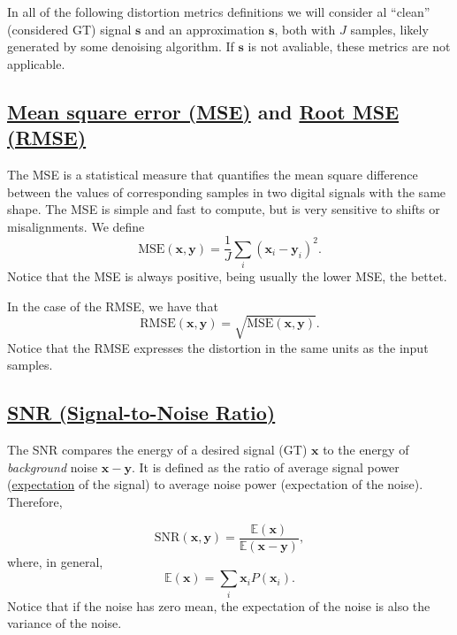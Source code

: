 \documentclass{article}
\begin{document}
In all of the following distortion metrics definitions we will
consider al ``clean'' (considered GT) signal $\mathbf{s}$ and an
approximation $\mathbf{s}$, both with $J$ samples, likely
generated by some denoising algorithm. If $\mathbf{s}$ is not
avaliable, these metrics are not applicable.

\subsection{\href{https://en.wikipedia.org/wiki/Mean_squared_error}{Mean square error (MSE)} and \href{https://en.wikipedia.org/wiki/Root_mean_square_deviation}{Root MSE (RMSE)}}

The MSE is a statistical measure that quantifies the mean square
difference between the values of corresponding samples in two digital
signals with the same shape. The MSE is simple and fast to compute,
but is very sensitive to shifts or misalignments. We define
\begin{equation}
  \text{MSE}(\mathbf{x},\mathbf{y}) = \frac{1}{J}\sum_i(\mathbf{x}_i - \mathbf{y}_i)^2.
  \label{eq:MSE}
\end{equation}
Notice that the MSE is always positive, being usually the lower MSE, the bettet.

In the case of the RMSE, we have that
\begin{equation}
  \text{RMSE}(\mathbf{x},\mathbf{y}) = \sqrt{\text{MSE}(\mathbf{x},\mathbf{y})}.
  \label{eq:RMSE}
\end{equation}
Notice that the RMSE expresses the distortion in the same units as the
input samples.


\subsection{\href{https://en.wikipedia.org/wiki/Signal-to-noise_ratio}{SNR (Signal-to-Noise Ratio)}}

The SNR compares the energy of a desired signal (GT) $\mathbf{x}$ to
the energy of \emph{background} noise $\mathbf{x}-\mathbf{y}$. It is
defined as the ratio of average signal power
(\href{https://en.wikipedia.org/wiki/Expected_value}{expectation} of
the signal) to average noise power (expectation of the
noise). Therefore,

\begin{equation}
  \text{SNR}(\mathbf{x},\mathbf{y}) = \frac{\mathbb{E}(\mathbf{x})}{\mathbb{E}(\mathbf{x} - \mathbf{y})},
  \label{eq:formal_SNR}
\end{equation}
where, in general, 
\begin{equation}
  \mathbb{E}(\mathbf{x}) = \sum_{i}\mathbf{x}_iP(\mathbf{x}_i).
  \label{eq:expectation}
\end{equation}
Notice that if the noise has zero mean, the expectation
of the noise is also the variance of the noise.
\end{document}
